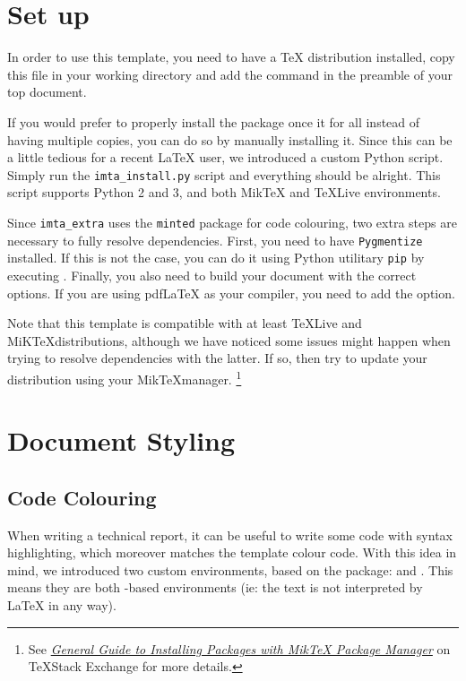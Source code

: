 \documentclass{report}
\begin{document}
\section{Set up}
In order to use this template, you need to have a \TeX{} distribution installed, copy this file in your working directory and add the  command in the preamble of your top document.

If you would prefer to properly install the package once it for all instead of having multiple copies, you can do so by manually installing it. 
Since this can be a little tedious for a recent \LaTeX{} user, we introduced a custom Python script. 
Simply run the \texttt{imta\_install.py} script and everything should be alright.
This script supports Python 2 and 3, and both Mik\TeX{} and \TeX{}Live environments. 

Since \texttt{imta\_extra} uses the \texttt{minted} package for code colouring, two extra steps are necessary to fully resolve dependencies. 
First, you need to have \texttt{Pygmentize} installed. 
If this is not the case, you can do it using Python utilitary \texttt{pip} by executing . 
Finally, you also need to build your document with the correct options. 
If you are using pdf\LaTeX{} as your compiler, you need to add the  option.

Note that this template is compatible with at least \TeX Live and MiK\TeX distributions, although we have noticed some issues might happen when trying to resolve dependencies with the latter. If so, then try to update your distribution using your Mik\TeX manager.
\footnote{See \textit{\href{https://tex.stackexchange.com/a/359851}{General Guide to Installing Packages with MikTeX Package Manager}} on \TeX Stack Exchange for more details.}


\section{Document Styling}
\subsection{Code Colouring}
When writing a technical report, it can be useful to write some code with syntax highlighting, which moreover matches the template colour code.
 With this idea in mind, we introduced two custom environments, based on the  package:  and . 
 This means they are both -based environments (ie: the text is not interpreted by \LaTeX{} in any way).
\end{document}
